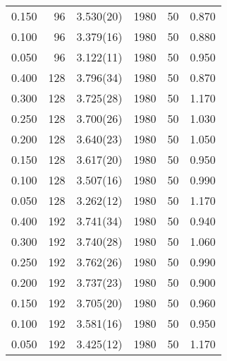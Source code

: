\begin{tabular}{rrlrrr}
 0.150 &      96 & 3.530(20)  &                 1980 &                   50 &    0.870 \\
 0.100 &      96 & 3.379(16)  &                 1980 &                   50 &    0.880 \\
 0.050 &      96 & 3.122(11)  &                 1980 &                   50 &    0.950 \\
 0.400 &     128 & 3.796(34)  &                 1980 &                   50 &    0.870 \\
 0.300 &     128 & 3.725(28)  &                 1980 &                   50 &    1.170 \\
 0.250 &     128 & 3.700(26)  &                 1980 &                   50 &    1.030 \\
 0.200 &     128 & 3.640(23)  &                 1980 &                   50 &    1.050 \\
 0.150 &     128 & 3.617(20)  &                 1980 &                   50 &    0.950 \\
 0.100 &     128 & 3.507(16)  &                 1980 &                   50 &    0.990 \\
 0.050 &     128 & 3.262(12)  &                 1980 &                   50 &    1.170 \\
 0.400 &     192 & 3.741(34)  &                 1980 &                   50 &    0.940 \\
 0.300 &     192 & 3.740(28)  &                 1980 &                   50 &    1.060 \\
 0.250 &     192 & 3.762(26)  &                 1980 &                   50 &    0.990 \\
 0.200 &     192 & 3.737(23)  &                 1980 &                   50 &    0.900 \\
 0.150 &     192 & 3.705(20)  &                 1980 &                   50 &    0.960 \\
 0.100 &     192 & 3.581(16)  &                 1980 &                   50 &    0.950 \\
 0.050 &     192 & 3.425(12)  &                 1980 &                   50 &    1.170 \\
\hline
\end{tabular}
